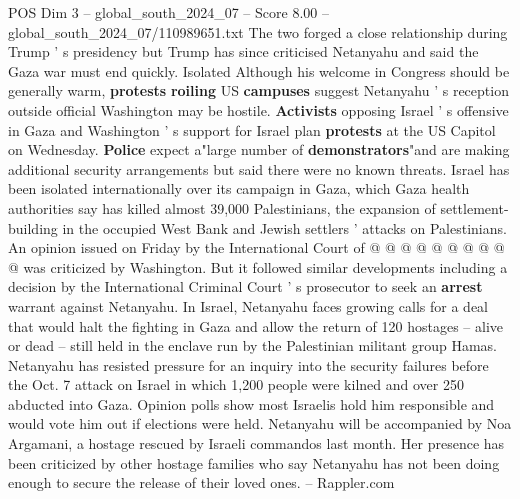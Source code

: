 \begin{textsample}{POS Dim 3 – global\_south\_2024\_07 – Score 8.00 – global\_south\_2024\_07/110989651.txt}
The two forged a close relationship during Trump ' s presidency but Trump has since criticised Netanyahu and said the Gaza war must end quickly.
Isolated Although his welcome in Congress should be generally warm, \textbf{protests} \textbf{roiling} US \textbf{campuses} suggest Netanyahu ' s reception outside official Washington may be hostile. \textbf{Activists} opposing Israel ' s offensive in Gaza and Washington ' s support for Israel plan \textbf{protests} at the US Capitol on Wednesday. \textbf{Police} expect a"large number of \textbf{demonstrators}"and are making additional security arrangements but said there were no known threats.
Israel has been isolated internationally over its campaign in Gaza, which Gaza health authorities say has killed almost 39,000 Palestinians, the expansion of settlement-building in the occupied West Bank and Jewish settlers ' attacks on Palestinians.
An opinion issued on Friday by the International Court of @ @ @ @ @ @ @ @ @ @ was criticized by Washington.
But it followed similar developments including a decision by the International Criminal Court ' s prosecutor to seek an \textbf{arrest} warrant against Netanyahu.
In Israel, Netanyahu faces growing calls for a deal that would halt the fighting in Gaza and allow the return of 120 hostages -- alive or dead -- still held in the enclave run by the Palestinian militant group Hamas.
Netanyahu has resisted pressure for an inquiry into the security failures before the Oct. 7 attack on Israel in which 1,200 people were kilned and over 250 abducted into Gaza.
Opinion polls show most Israelis hold him responsible and would vote him out if elections were held.
Netanyahu will be accompanied by Noa Argamani, a hostage rescued by Israeli commandos last month.
Her presence has been criticized by other hostage families who say Netanyahu has not been doing enough to secure the release of their loved ones. -- Rappler.com

\end{textsample}
